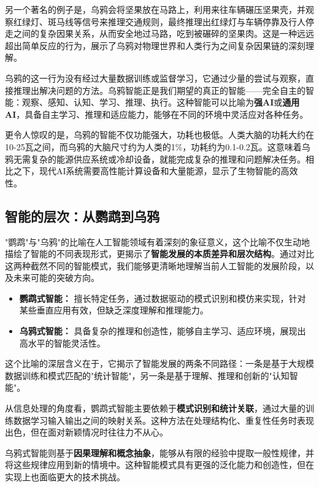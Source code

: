 另一个著名的例子是，乌鸦会将坚果放在马路上，利用来往车辆碾压坚果壳，并观察红绿灯、斑马线等信号来推理交通规则，最终推理出红绿灯与车辆停靠及行人停走之间的复杂因果关系，从而安全地过马路，吃到被碾碎的坚果肉。这是一种远远超出简单反应的行为，展示了乌鸦对物理世界和人类行为之间复杂因果链的深刻理解。

乌鸦的这一行为没有经过大量数据训练或监督学习，它通过少量的尝试与观察，直接推理出解决问题的方法。乌鸦智能正是我们期望的真正的智能——完全自主的智能：观察、感知、认知、学习、推理、执行。这种智能可以比喻为\textbf{强AI}或\textbf{通用AI}，具备自主学习、推理和适应能力，能够在不同的环境中灵活应对各种任务。

更令人惊叹的是，乌鸦的智能不仅功能强大，功耗也极低。人类大脑的功耗大约在10-25瓦之间，而乌鸦的大脑尺寸约为人类的1\%，功耗约为0.1-0.2瓦。这意味着乌鸦无需复杂的能源供应系统或冷却设备，就能完成复杂的推理和问题解决任务。相比之下，现代AI系统需要高性能计算设备和大量能源，显示了生物智能的高效性。

\subsection*{智能的层次：从鹦鹉到乌鸦}

"鹦鹉"与"乌鸦"的比喻在人工智能领域有着深刻的象征意义，这个比喻不仅生动地描绘了智能的不同表现形式，更揭示了\textbf{智能发展的本质差异和层次结构}。通过对比这两种截然不同的智能模式，我们能够更清晰地理解当前人工智能的发展阶段，以及未来可能的突破方向。

\begin{itemize}
\item \textbf{鹦鹉式智能：} 擅长特定任务，通过数据驱动的模式识别和模仿来实现，针对某些垂直应用有效，但缺乏深度理解和推理能力。
\item \textbf{乌鸦式智能：} 具备复杂的推理和创造性，能够自主学习、适应环境，展现出高水平的智能灵活性。
\end{itemize}

这个比喻的深层含义在于，它揭示了智能发展的两条不同路径：一条是基于大规模数据训练和模式匹配的"统计智能"，另一条是基于理解、推理和创新的"认知智能"。

从信息处理的角度看，鹦鹉式智能主要依赖于\textbf{模式识别和统计关联}，通过大量的训练数据学习输入输出之间的映射关系。这种方法在处理结构化、重复性任务时表现出色，但在面对新颖情况时往往力不从心。

乌鸦式智能则基于\textbf{因果理解和概念抽象}，能够从有限的经验中提取一般性规律，并将这些规律应用到新的情境中。这种智能模式具有更强的泛化能力和创造性，但在实现上也面临更大的技术挑战。

